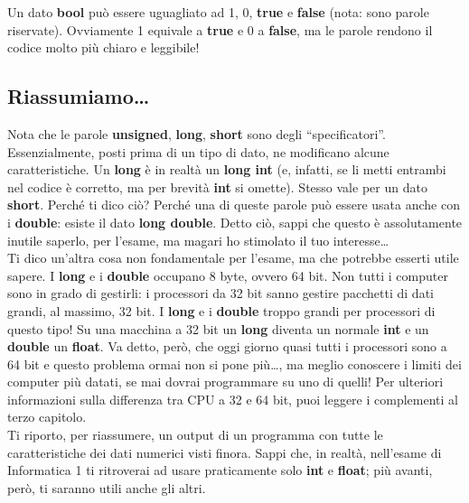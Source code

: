 	Un dato \textbf{bool} può essere uguagliato ad 1, 0, \textbf{true} e \textbf{false} (nota: sono parole riservate). Ovviamente 1 equivale a \textbf{true} e 0 a \textbf{false}, ma le parole rendono il codice molto più chiaro e leggibile!
	 
	\subsection{Riassumiamo\ldots}
	Nota che le parole \textbf{unsigned}, \textbf{long}, \textbf{short} sono degli ``specificatori''. Essenzialmente, posti prima di un tipo di dato, ne modificano alcune caratteristiche. Un \textbf{long} è in realtà un \textbf{long int} (e, infatti, se li metti entrambi nel codice è corretto, ma per brevità \textbf{int} si omette). Stesso vale per un dato \textbf{short}. Perché ti dico ciò? Perché una di queste parole può essere usata anche con i \textbf{double}: esiste il dato \textbf{long double}. Detto ciò, sappi che questo è assolutamente inutile saperlo, per l'esame, ma magari ho stimolato il tuo interesse\ldots \\
	
	Ti dico un'altra cosa non fondamentale per l'esame, ma che potrebbe esserti utile sapere. I \textbf{long} e i \textbf{double} occupano 8 byte, ovvero 64 bit. Non tutti i computer sono in grado di gestirli: i processori da 32 bit sanno gestire pacchetti di dati grandi, al massimo, 32 bit. I \textbf{long} e i \textbf{double} troppo grandi per processori di questo tipo! Su una macchina a 32 bit un \textbf{long} diventa un normale \textbf{int} e un \textbf{double} un \textbf{float}. Va detto, però, che oggi giorno quasi tutti i processori sono a 64 bit e questo problema ormai non si pone più\ldots, ma meglio conoscere i limiti dei computer più datati, se mai dovrai programmare su uno di quelli! Per ulteriori informazioni sulla differenza tra CPU a 32 e 64 bit, puoi leggere i complementi al terzo capitolo.\\
	
	
	Ti riporto, per riassumere, un output di un programma con tutte le caratteristiche dei dati numerici visti finora. Sappi che, in realtà, nell'esame di Informatica 1 ti ritroverai ad usare praticamente solo \textbf{int} e \textbf{float}; più avanti, però, ti saranno utili anche gli altri.
	
